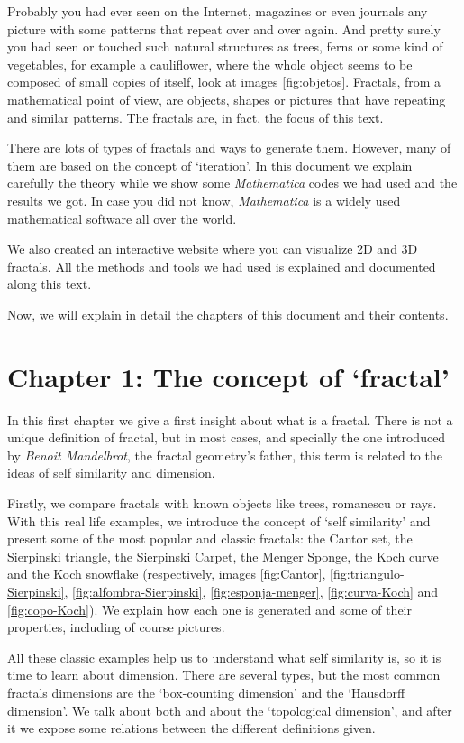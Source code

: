 
Probably you had ever seen on the Internet, magazines or even journals any picture with some patterns that repeat over and over again. And pretty surely you had seen or touched such natural structures as trees, ferns or some kind of vegetables, for example a cauliflower, where the whole object seems to be composed of small copies of itself, look at images \ref{fig:objetos}. Fractals, from a mathematical point of view, are objects, shapes or pictures that have repeating and similar patterns. The fractals are, in fact, the focus of this text.

There are lots of types of fractals and ways to generate them. However, many of them are based on the concept of `iteration'. In this document we explain carefully the theory while we show some \textit{Mathematica} codes we had used and the results we got. In case you did not know, \textit{Mathematica} is a widely used mathematical software all over the world. 

We also created an interactive website where you can visualize 2D and 3D fractals. All the methods and tools we had used is explained and documented along this text.

Now, we will explain in detail the chapters of this document and their contents.

\section*{Chapter 1: The concept of `fractal'}

In this first chapter we give a first insight about what is a fractal. There is not a unique definition of fractal, but in most cases, and specially the one introduced by \textit{Benoit Mandelbrot}, the fractal geometry's father, this term is related to the ideas of self similarity and dimension. 

Firstly, we compare fractals with known objects like trees, romanescu or rays. With this real life examples, we introduce the concept of `self similarity' and present some of the most popular and classic fractals: the Cantor set, the Sierpinski triangle, the Sierpinski Carpet, the Menger Sponge, the Koch curve and the Koch snowflake (respectively, images \ref{fig:Cantor}, \ref{fig:triangulo-Sierpinski}, \ref{fig:alfombra-Sierpinski}, \ref{fig:esponja-menger}, \ref{fig:curva-Koch} and \ref{fig:copo-Koch}). We explain how each one is generated and some of their properties, including of course pictures.

All these classic examples help us to understand what self similarity is, so it is time to learn about dimension. There are several types, but the most common fractals dimensions are the `box-counting dimension' and the `Hausdorff dimension'. We talk about both and about the `topological dimension', and after it we expose some relations between the different definitions given.

